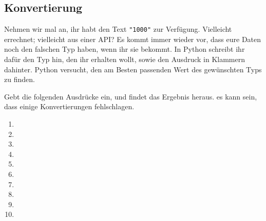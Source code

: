 \subsection{Konvertierung}

Nehmen wir mal an, ihr habt den Text \texttt{"1000"} zur Verfügung. Vielleicht
errechnet; vielleicht aus einer API? Es kommt immer wieder vor, dass eure Daten
noch den falschen Typ haben, wenn ihr sie bekommt. In Python schreibt ihr dafür
den Typ hin, den ihr erhalten wollt, sowie den Ausdruck in Klammern dahinter.
Python versucht, den am Besten passenden Wert des gewünschten Typs zu finden.

Gebt die folgenden Ausdrücke ein, und findet das Ergebnis heraus. es kann sein,
dass einige Konvertierungen fehlschlagen.

\begin{multicols}{3}
    \begin{enumerate}
        \item {}
        \item {}
        \item {}
        \item {}
        \item {}
        \item {}
        \item {}
        \item {}
        \item {}
        \item {}
    \end{enumerate}
\end{multicols}
